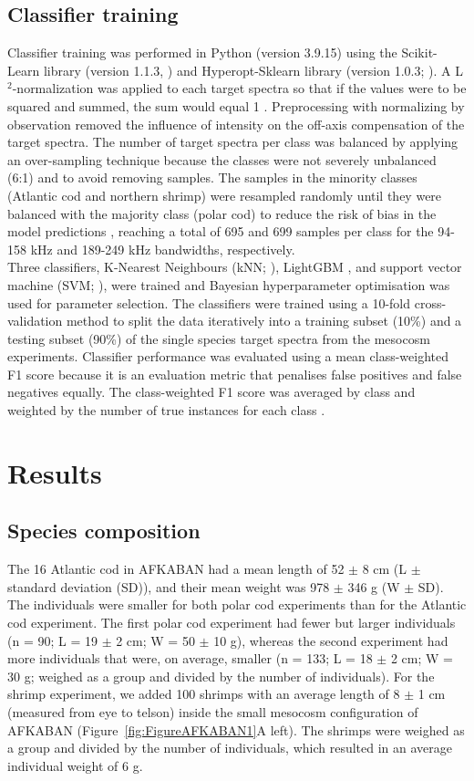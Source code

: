 {\subsection{Classifier training}
Classifier training was performed in Python (version 3.9.15) using the Scikit-Learn library (version 1.1.3, \citealt{Pedregosa2011}) and Hyperopt-Sklearn library (version 1.0.3; \citealt{Komer2014}). A L$^2$-normalization was applied to each target spectra so that if the values were to be squared and summed, the sum would equal 1 \citep{Komer2014}. Preprocessing with normalizing by observation removed the influence of intensity on the off-axis compensation of the target spectra. The number of target spectra per class was balanced by applying an over-sampling technique because the classes were not severely unbalanced (6:1) and to avoid removing samples. The samples in the minority classes (Atlantic cod and northern shrimp) were resampled randomly until they were balanced with the majority class (polar cod) to reduce the risk of bias in the model predictions \citep{Goodfellow2016}, reaching a total of 695 and 699 samples per class for the 94-158 kHz and 189-249 kHz bandwidths, respectively.\\
Three classifiers, K-Nearest Neighbours (kNN; \citealt{Goldberger2004}), LightGBM \citep{Ke2017}, and support vector machine (SVM; \citealt{Cortes1995}), were trained and Bayesian hyperparameter optimisation was used for parameter selection. The classifiers were trained using a 10-fold cross-validation method \citep{Stone1974} to split the data iteratively into a training subset (10\%) and a testing subset (90\%)  of the single species target spectra from the mesocosm experiments. Classifier performance was evaluated using a mean class-weighted F1 score because it is an evaluation metric that penalises false positives and false negatives equally. The class-weighted F1 score was averaged by class and weighted by the number of true instances for each class \citep{Pedregosa2011}.

\section{Results}
\subsection{Species composition}
The 16 Atlantic cod in AFKABAN had a mean length of 52 $\pm$ 8 cm (L $\pm$ standard deviation (SD)), and their mean weight was 978 $\pm$ 346 g (W $\pm$ SD). The individuals were smaller for both polar cod experiments than for the Atlantic cod experiment. The first polar cod experiment had fewer but larger individuals (n = 90; L = 19 $\pm$ 2 cm; W = 50 $\pm$ 10 g), whereas the second experiment had more individuals that were, on average, smaller (n = 133; L = 18 $\pm$ 2 cm; W = 30 g; weighed as a group and divided by the number of individuals). For the shrimp experiment, we added 100 shrimps with an average length of 8 $\pm$ 1 cm (measured from eye to telson) inside the small mesocosm configuration of AFKABAN (Figure~\ref{fig:FigureAFKABAN1}A left). The shrimps were weighed as a group and divided by the number of individuals, which resulted in an average individual weight of 6 g.

}
